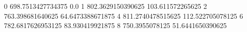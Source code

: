 0 698.7513427734375 0.0
1 802.3629150390625 103.611572265625
2 763.398681640625 64.6473388671875
4 811.2740478515625 112.522705078125
6 782.6817626953125 83.930419921875
8 750.3955078125 51.6441650390625
